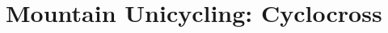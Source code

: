 \part{Mountain Unicycling: Cyclocross \label{part:muni-cyclocross}}
\parttoc
\thispagestyle{empty}





